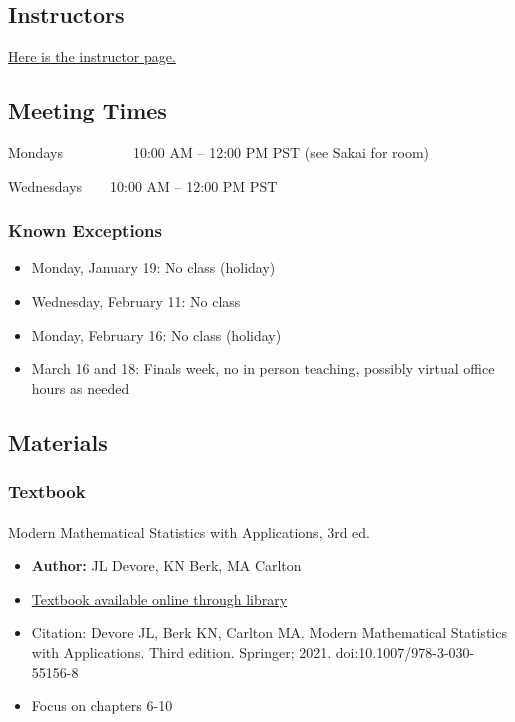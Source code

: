 \documentclass[
  letterpaper,
  DIV=11,
  numbers=noendperiod]{scrartcl}
\makeatletter
\let\oldparagraph\paragraph
\renewcommand{\paragraph}{
    \@ifstar
      \xxxParagraphStar
      \xxxParagraphNoStar
  }
\newcommand{\xxxParagraphStar}[1]{\oldparagraph*{#1}\mbox{}}
\newcommand{\xxxParagraphNoStar}[1]{\oldparagraph{#1}\mbox{}}
\providecommand{\tightlist}{%
  \setlength{\itemsep}{0pt}\setlength{\parskip}{0pt}}\usepackage{longtable,booktabs,array}
\makeatother
\begin{document}
\subsection{Instructors}\label{instructors}

\href{instructors.qmd}{Here is the instructor page.}

\subsection{Meeting Times}\label{meeting-times}

Mondays~~~~~~~~~~10:00 AM -- 12:00 PM PST (see Sakai for room)

Wednesdays~~~~10:00 AM -- 12:00 PM PST

\subsubsection{Known Exceptions}\label{known-exceptions}

\begin{itemize}
\tightlist
\item
  Monday, January 19: No class (holiday)
\item
  Wednesday, February 11: No class
\item
  Monday, February 16: No class (holiday)
\item
  March 16 and 18: Finals week, no in person teaching, possibly virtual
  office hours as needed
\end{itemize}

\subsection{Materials}\label{materials}

\subsubsection{Textbook}\label{textbook}

\paragraph{Modern Mathematical Statistics with Applications, 3rd
ed.}\label{modern-mathematical-statistics-with-applications-3rd-ed.}

\begin{itemize}
\item
  \textbf{Author:} JL Devore, KN Berk, MA Carlton
\item
  \href{https://librarysearch.ohsu.edu/permalink/01ALLIANCE_OHSU/okd4j/alma99900609916301858}{Textbook
  available online through library}
\item
  Citation: Devore JL, Berk KN, Carlton MA. Modern Mathematical
  Statistics with Applications. Third edition. Springer; 2021.
  doi:10.1007/978-3-030-55156-8
\item
  Focus on chapters 6-10
\end{itemize}
\end{document}
